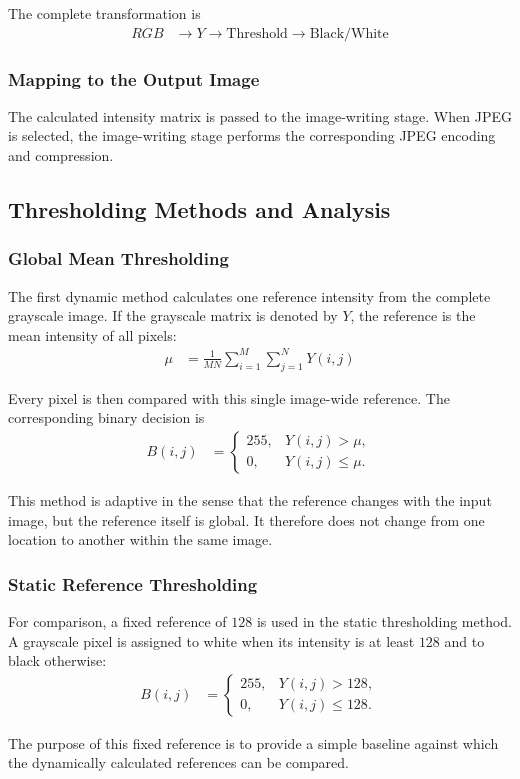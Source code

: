 The complete transformation is
\begin{align}
RGB &\rightarrow Y \rightarrow \text{Threshold}
\rightarrow \text{Black/White}\label{eq:app_rgb_bw_pipeline}
\end{align}

\subsubsection{Mapping to the Output Image}

The calculated intensity matrix is passed to the image-writing stage.
When JPEG is selected, the image-writing stage performs the
corresponding JPEG encoding and compression.

\subsection{Thresholding Methods and Analysis}
\label{sec:thresholding_methods}
\subsubsection{Global Mean Thresholding}
\label{th:global_mean}
The first dynamic method calculates one reference intensity from the
complete grayscale image. If the grayscale matrix is denoted by $Y$,
the reference is the mean intensity of all pixels:
\begin{align}
\mu &= \frac{1}{MN}\sum_{i=1}^{M}\sum_{j=1}^{N}Y(i,j)\label{eq:app_global_mean}
\end{align}

Every pixel is then compared with this single image-wide reference. The
corresponding binary decision is
\begin{align}
B(i,j)&=
\begin{cases}
255, & Y(i,j)>\mu,\\
0, & Y(i,j)\leq\mu.
\end{cases}\label{eq:app_global_mean_threshold}
\end{align}

This method is adaptive in the sense that the reference changes with the
input image, but the reference itself is global. It therefore does not
change from one location to another within the same image.

\subsubsection{Static Reference Thresholding}
\label{th:global_static}
For comparison, a fixed reference of $128$ is used in the static
thresholding method. A grayscale pixel is assigned to white when its
intensity is at least $128$ and to black otherwise:
\begin{align}
B(i,j)&=
\begin{cases}
255, & Y(i,j)>128,\\
0, & Y(i,j)\leq128.
\end{cases}\label{eq:app_static_threshold}
\end{align}

The purpose of this fixed reference is to provide a simple baseline
against which the dynamically calculated references can be compared.

